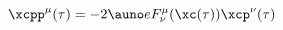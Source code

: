 \begin{equation}
\xcpp^\mu(\tau)=-2\auno e F^\mu_\nu(\xc(\tau)) \xcp^\nu(\tau)
\label{eqmoto}
\end{equation}

